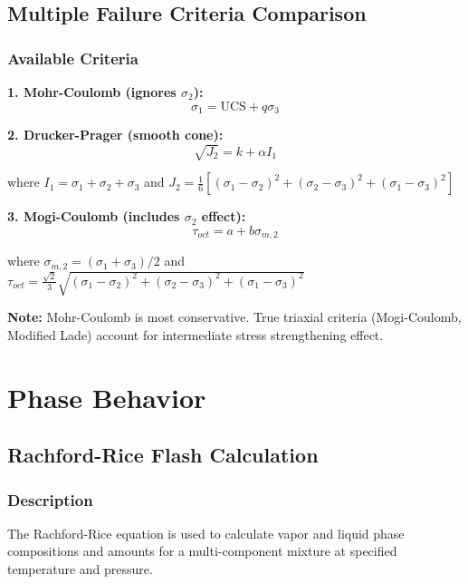 \documentclass[11pt,a4paper]{article}
\begin{document}
\subsection{Multiple Failure Criteria Comparison}

\subsubsection{Available Criteria}

\begin{tcolorbox}[colback=formulabox,colframe=black!75]
\textbf{1. Mohr-Coulomb (ignores $\sigma_2$):}
\begin{equation}
\sigma_1 = \text{UCS} + q\sigma_3
\end{equation}

\textbf{2. Drucker-Prager (smooth cone):}
\begin{equation}
\sqrt{J_2} = k + \alpha I_1
\end{equation}

where $I_1 = \sigma_1 + \sigma_2 + \sigma_3$ and $J_2 = \frac{1}{6}[(\sigma_1-\sigma_2)^2 + (\sigma_2-\sigma_3)^2 + (\sigma_1-\sigma_3)^2]$

\textbf{3. Mogi-Coulomb (includes $\sigma_2$ effect):}
\begin{equation}
\tau_{oct} = a + b \sigma_{m,2}
\end{equation}

where $\sigma_{m,2} = (\sigma_1 + \sigma_3)/2$ and $\tau_{oct} = \frac{\sqrt{2}}{3}\sqrt{(\sigma_1-\sigma_2)^2 + (\sigma_2-\sigma_3)^2 + (\sigma_1-\sigma_3)^2}$
\end{tcolorbox}

\textbf{Note:} Mohr-Coulomb is most conservative. True triaxial criteria (Mogi-Coulomb, Modified Lade) account for intermediate stress strengthening effect.

\newpage

\section{Phase Behavior}

\subsection{Rachford-Rice Flash Calculation}

\subsubsection{Description}
The Rachford-Rice equation is used to calculate vapor and liquid phase compositions and amounts for a multi-component mixture at specified temperature and pressure.
\end{document}
